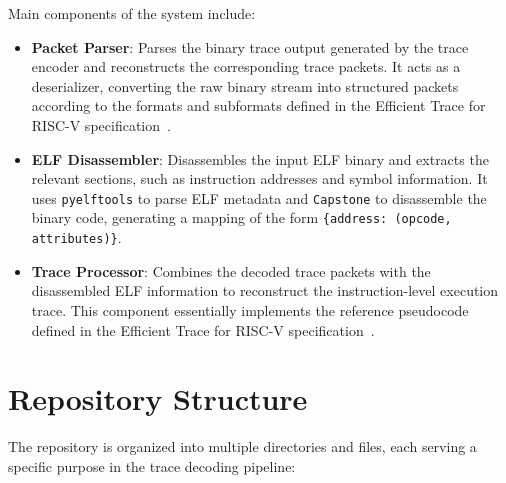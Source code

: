 \documentclass[a4paper,12pt]{article}
\begin{document}
Main components of the system include:
\begin{itemize}
    \item \textbf{Packet Parser}: Parses the binary trace output generated by the trace encoder and reconstructs the corresponding trace packets. It acts as a deserializer, converting the raw binary stream into structured packets according to the formats and subformats defined in the Efficient Trace for RISC-V specification~\cite[Chapter~7]{riscv_trace_spec}.

    \item \textbf{ELF Disassembler}: Disassembles the input ELF binary and extracts the relevant sections, such as instruction addresses and symbol information. It uses \texttt{pyelftools} to parse ELF metadata and \texttt{Capstone} to disassemble the binary code, generating a mapping of the form \texttt{\{address: (opcode, attributes)\}}.
    \item \textbf{Trace Processor}: Combines the decoded trace packets with the disassembled ELF information to reconstruct the instruction-level execution trace. This component essentially implements the reference pseudocode defined in the Efficient Trace for RISC-V specification~\cite[Chapter~11]{riscv_trace_spec}.

\end{itemize}



\section{Repository Structure}

The repository is organized into multiple directories and files, each serving a specific purpose in the trace decoding pipeline:
\end{document}
